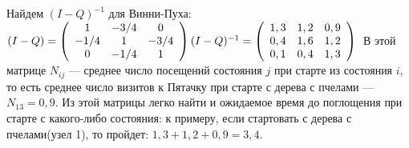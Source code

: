 Найдем $(I-Q)^{-1}$ для Винни-Пуха:\\
$(I-Q)=
\left(\begin{array}{ccc}
1 & -3/4 & 0\\
-1/4 & 1 & -3/4\\
0 & -1/4 & 1
\end{array}\right)\\
(I-Q)^{-1}=
\left(\begin{array}{ccc}
1,3 & 1,2 & 0,9\\
0,4 & 1,6 & 1,2\\
0,1 & 0,4 & 1,3
\end{array}\right)\\
$ В этой матрице $N_{ij}$ --- среднее число посещений состояния $j$ при старте из состояния $i$, то есть среднее число визитов к Пятачку при старте с дерева с пчелами --- $N_{13}=0,9$. Из этой матрицы легко найти и ожидаемое время до поглощения при старте с какого-либо состояния: к примеру, если стартовать с дерева с пчелами(узел 1), то пройдет: $1,3+1,2+0,9=3,4$.\\

